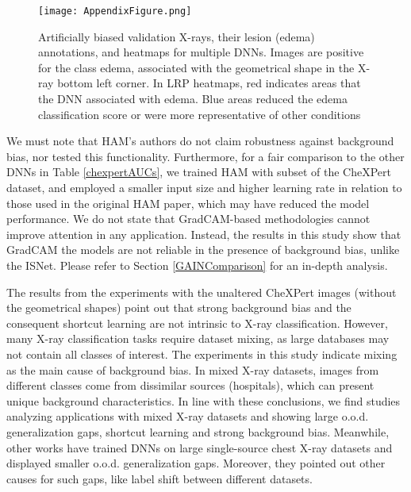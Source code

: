 \documentclass[fleqn,10pt]{wlscirep}
\begin{document}
{\begin{figure}[!h]
\texttt{[image: AppendixFigure.png]}
\centering
\caption{Artificially biased validation X-rays, their lesion (edema) annotations, and  heatmaps for multiple DNNs. Images are positive for the class edema, associated with the geometrical shape in the X-ray bottom left corner. In LRP heatmaps, red indicates areas that the DNN associated with edema. Blue areas reduced the edema classification score or were more representative of other conditions}
\label{chexBias}
\end{figure}

We must note that HAM's authors do not claim robustness against background bias, nor tested this functionality\cite{HAM}. Furthermore, for a fair comparison to the other DNNs in Table \ref{chexpertAUCs}, we trained HAM with subset of the CheXPert dataset, and employed a smaller input size and higher learning rate in relation to those used in the original HAM paper\cite{HAM}, which may have reduced the model performance. We do not state that GradCAM-based methodologies cannot improve attention in any application. Instead, the results in this study show that GradCAM the models are not reliable in the presence of background bias, unlike the ISNet. Please refer to Section \ref{GAINComparison} for an in-depth analysis.

The results from the experiments with the unaltered CheXPert images (without the geometrical shapes) point out that strong background bias and the consequent shortcut learning are not intrinsic to X-ray classification. However, many X-ray classification tasks require dataset mixing, as large databases may not contain all classes of interest. The experiments in this study indicate mixing as the main cause of background bias. In mixed X-ray datasets, images from different classes come from dissimilar sources (hospitals), which can present unique background characteristics. In line with these conclusions, we find studies analyzing applications with mixed X-ray datasets and showing large o.o.d. generalization gaps, shortcut learning and strong background bias\cite{ShortcutCovid}. Meanwhile, other works have trained DNNs on large single-source chest X-ray datasets and displayed smaller o.o.d. generalization gaps\cite{LabelShift}. Moreover, they pointed out other causes for such gaps, like label shift between different datasets\cite{LabelShift}.

}
\end{document}
